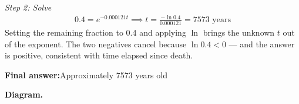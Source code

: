 \documentclass[11pt]{article}
\begin{document}
\textit{Step 2: Solve}
\[\begin{gathered}
0.4 = e^{-0.000121t} \implies t = \frac{-\ln 0.4}{0.000121} = 7573 \text{ years}
\end{gathered}\]
Setting the remaining fraction to 0.4 and applying \( \ln \) brings the unknown \( t \) out of the exponent. The two negatives cancel because \( \ln 0.4 < 0 \) --- and the answer is positive, consistent with time elapsed since death.

\begin{answerbox}
\textbf{Final answer:}\quad Approximately 7573 years old
\end{answerbox}
\textbf{Diagram.}

\begin{center}
\end{center}
\end{document}
